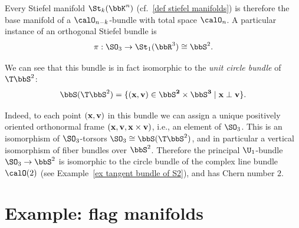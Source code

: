 \begin{example}\label{ex O2 Stiefel bundle}
    Every Stiefel manifold $\St_k(\bbK^n)$ (cf.\ \ref{def stiefel manifolds}) is therefore the base manifold of a $\calO_{n-k}$-bundle with total space $\calO_n$. A particular instance of an orthogonal Stiefel bundle is \[\pi:\SO_3\to \St_1(\bbR^3)\cong \bbS^2.\]

    We can see that this bundle is in fact isomorphic to the \emph{unit circle bundle} of $\T\bbS^2$:
    \[\bbS(\T\bbS^2)=\{(\bf{x},\bf{v})\in\bbS^2\times\bbS^3\mid \bf{x}\perp\bf{v}\}.\]

    Indeed, to each point $(\bf{x},\bf{v})$ in this bundle we can assign a unique positively oriented orthonormal frame $(\bf{x},\bf{v},\bf{x}\times\bf{v})$, i.e., an element of $\SO_3$. This is an isomorphism of $\SO_3$-torsors $\SO_3\cong \bbS(\T\bbS^2)$, and in particular a vertical isomorphism of fiber bundles over $\bbS^2$.  Therefore the principal $\U_1$-bundle $\SO_3\to \bbS^2$ is isomorphic to the circle bundle of the complex line bundle $\calO(2)$ (see Example~\ref{ex tangent bundle of S2}), and has Chern number $2$.
\end{example}







\section{Example: flag manifolds}\label{sec: flag manifolds}


